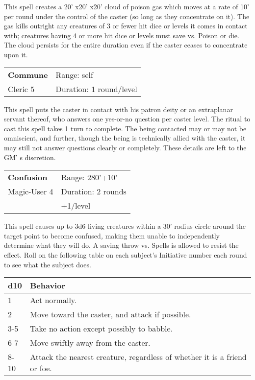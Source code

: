 \documentclass[a4paper,twoside,openany,10pt]{book}
\begin{document}
\begin{multicols}{2}
This spell creates a 20' x20' x20'{} cloud of poison gas which moves at a rate of 10'{} per round under the control of the caster (so long as they concentrate on it). The gas kills outright any creatures of 3 or fewer hit dice or levels it comes in contact with; creatures having 4 or more hit dice or levels must save vs. Poison or die. The cloud persists for the entire duration even if the caster ceases to concentrate upon it.

\smallskip\begin{flushleft} 
	\begin{tabularx}{0.45\textwidth}{@{}m{3.5cm}m{5.5cm}@{}} 
		\textbf{Commune} & Range: self\\
		Cleric 5 & Duration: 1 round/level\\	
	\end{tabularx}\end{flushleft}

This spell puts the caster in contact with his patron deity or an extraplanar servant thereof, who answers one yes-or-no question per caster level. The ritual to cast this spell takes 1 turn to complete. The being contacted may or may not be omniscient, and further, though the being is technically allied with the caster, it may still not answer questions clearly or completely. These details are left to the GM' s discretion.

\smallskip\begin{flushleft} 
	\begin{tabularx}{0.45\textwidth}{@{}m{3.5cm}m{5.5cm}@{}} 
		\textbf{Confusion} & Range: 280'+10'\\
		Magic-User 4 & Duration: 2 rounds\\
		&+1/level\\	
	\end{tabularx}\end{flushleft}

This spell causes up to 3d6 living creatures within a 30'{} radius circle around the target point to become confused\emph{, }making them unable to independently determine what they will do. A saving throw vs. Spells is allowed to resist the effect. Roll on the following table on each subject's Initiative number each round to see what the subject does.\medskip

\begin{tabularx}{0.45\textwidth}{@{}lX@{}}
\textbf{d10} & \textbf{Behavior} \\\hline
1 & Act normally. \\\hline
2 & Move toward the caster, and attack if possible. \\\hline
3-5 & Take no action except possibly to babble. \\\hline
6-7 & Move swiftly away from the caster. \\\hline
8-10 & Attack the nearest creature, regardless of whether it is a friend
or foe. \\\hline
\end{tabularx}\medskip


\end{multicols}
\end{document}

